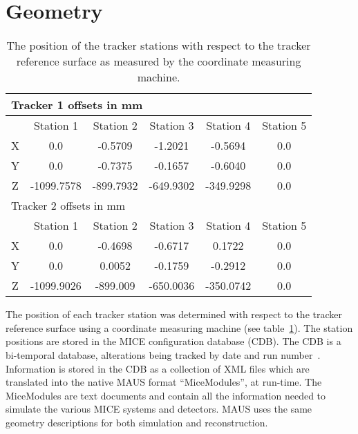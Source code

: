 \section{Geometry}
\label{sec:Geometry}
  
  \begin{table} [tbp]
  \begin{center}
  \begin{tabular} {|c|c|c|c|c|c|}
    \hline
    \multicolumn{6}{|l|}{Tracker 1 offsets in mm} \\
    \hline
    & Station 1 & Station 2 & Station 3 & Station 4 & Station 5 \\
    \hline
    X & 0.0 & -0.5709 & -1.2021 & -0.5694 & 0.0 \\
    Y & 0.0 & -0.7375 & -0.1657 & -0.6040 & 0.0 \\
    Z & -1099.7578 & -899.7932 & -649.9302 & -349.9298 & 0.0 \\
    \hline
    \hline
    \multicolumn{6}{|l|}{Tracker 2 offsets in mm} \\
    \hline
    & Station 1 & Station 2 & Station 3 & Station 4 & Station 5 \\
    \hline
    X & 0.0 & -0.4698 & -0.6717 & 0.1722 & 0.0 \\
    Y & 0.0 & 0.0052 & -0.1759 & -0.2912 & 0.0 \\
    Z & -1099.9026 & -899.009 & -650.0036 & -350.0742 & 0.0 \\
    \hline
  \end{tabular}
  \caption{\label{tab:CMM} The position of the tracker stations with respect to the tracker reference surface as measured by the coordinate measuring machine.}
  \end{center}
  \end{table}
  
  The position of each tracker station was determined with respect to the tracker reference surface using a coordinate measuring machine (see table~\ref{tab:CMM}). The station positions are stored in the MICE configuration database (CDB). The CDB is a bi-temporal database, alterations being tracked by date and run number~\cite{DavidForrestThesis}. Information is stored in the CDB as a collection of XML files which are translated into the native MAUS format ``MiceModules'', at run-time.  The MiceModules are text documents and contain all the information needed to simulate the various MICE systems and detectors.  MAUS uses the same geometry descriptions for both simulation and reconstruction. 
  
